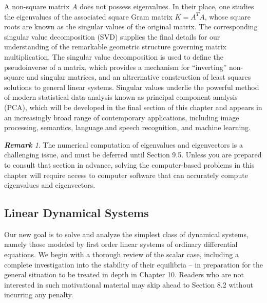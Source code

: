 \documentclass[12pt]{article}
\theoremstyle{remark}
\newtheorem*{remark}{\textbf{Remark}}
\begin{document}
A non-square matrix $A$ does not possess eigenvalues. In their place, one studies the eigenvalues of the associated square Gram matrix $K=A^TA$, whose square roots are known as the singular values of the original matrix. The corresponding singular value decomposition (SVD) supplies the final details for our understanding of the remarkable geometric structure governing matrix multiplication. The singular value decomposition is used to define the pseudoinverse of a matrix, which provides a mechanism for ``inverting'' non-square and singular matrices, and an altrernative construction of least squares solutions to general linear systems. Singular values underlie the powerful method of modern statistical data analysis known as principal component analysis (PCA), which will be developed in the final section of this chapter and appears in an increasingly broad range of contemporary applications, including image processing, semantics, language and speech recognition, and machine learning.

\begin{remark}
The numerical computation of eigenvalues and eigenvectors is a challenging issue, and must be deferred until Section 9.5. Unless you are prepared to consult that section in advance, solving the computer-based problems in this chapter will require access to computer software that can accurately compute eigenvalues and eigenvectors.
\end{remark}

\subsection{Linear Dynamical Systems}
Our new goal is to solve and analyze the simplest class of dynamical systems, namely those modeled by first order linear systems of ordinary differential equations. We begin with a thorough review of the scalar case, including a complete investigation into the stability of their equilibria -- in preparation for the general situation to be treated in depth in Chapter 10. Readers who are not interested in such motivational material may skip ahead to Section 8.2 without incurring any penalty.
\end{document}

